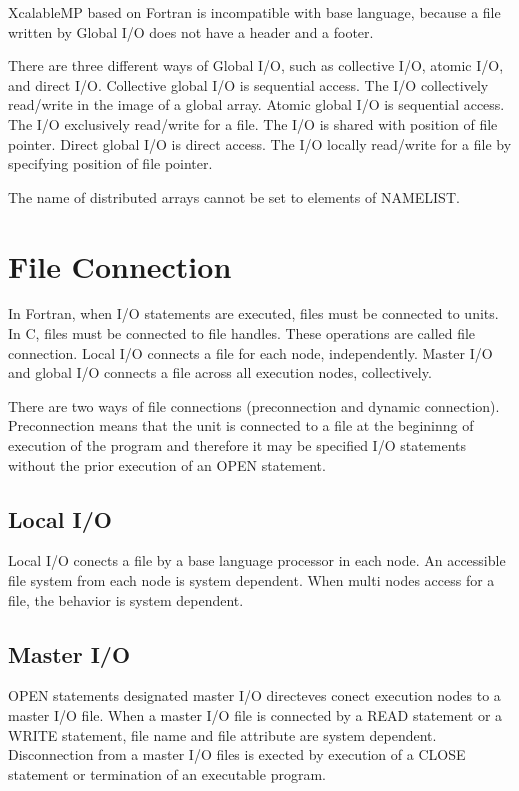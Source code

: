   XcalableMP based on Fortran is incompatible with base language,
  because a file written by Global I/O does not have a header and a
  footer.

  There  are three different ways of Global I/O, such as collective
  I/O, atomic I/O, and direct I/O.
  Collective global I/O is sequential access.
  The I/O collectively read/write in the image of a global array.
  Atomic global I/O is sequential access.
  The I/O exclusively read/write for a file. The I/O is shared with
  position of file pointer.
  Direct global I/O is direct access.
  The I/O locally read/write for a file by specifying position of file
  pointer.

  The name of distributed arrays cannot be set to elements of NAMELIST.

  \section{File Connection}

  In Fortran, when I/O statements are executed, files must be
  connected to units. 
  In C, files must be connected to file handles. These operations are
  called file connection.
  Local I/O connects a file for each node, independently.
  Master I/O and global I/O connects a file across
  all execution nodes, collectively. 
  
  There are two ways of file connections (preconnection and dynamic
  connection).
  Preconnection means that the unit is connected to a file at the
  begininng of execution of the program and therefore it may be specified
  I/O statements without the prior execution of an OPEN
  statement.


  \subsection{Local I/O}

  Local I/O conects a file by a base language processor in each node.
  An accessible file system from each node is system dependent.
  When multi nodes access for a file, the behavior is system dependent.

  
  \subsection{Master I/O}
  
  OPEN statements designated master I/O directeves conect execution
  nodes to a master I/O file.
  When a master I/O file is connected by a READ statement or a WRITE
  statement, file name and file attribute are system dependent.
  Disconnection from a master I/O files is exected by execution of a CLOSE
  statement or termination of an executable program.

